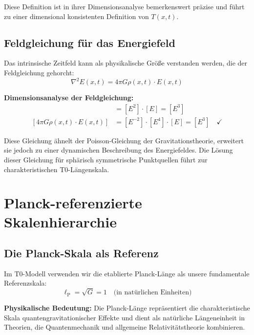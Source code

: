 \documentclass[12pt,a4paper]{report}
\newcommand{\lP}{\ell_{\text{P}}}         %
\begin{document}
	Diese Definition ist in ihrer Dimensionsanalyse bemerkenswert präzise und führt zu einer dimensional konsistenten Definition von $T(x,t)$.
	
	\subsection{Feldgleichung für das Energiefeld}\label{subsec:field_equation}
	
	Das intrinsische Zeitfeld kann als physikalische Größe verstanden werden, die der Feldgleichung gehorcht:
	\begin{equation}
		\nabla^2 E(x,t) = 4\pi G \rho(x,t) \cdot E(x,t)
		\label{eq:energy_field_equation}
	\end{equation}
	
	\textbf{Dimensionsanalyse der Feldgleichung:}
	\begin{align}
		[\nabla^2 E(x,t)] &= [E^2] \cdot [E] = [E^3] \\
		[4\pi G \rho(x,t) \cdot E(x,t)] &= [E^{-2}] \cdot [E^4] \cdot [E] = [E^3] \quad \checkmark
	\end{align}
	
	Diese Gleichung ähnelt der Poisson-Gleichung der Gravitationstheorie, erweitert sie jedoch zu einer dynamischen Beschreibung des Energiefeldes. Die Lösung dieser Gleichung für sphärisch symmetrische Punktquellen führt zur charakteristischen T0-Längenskala.
	
	\section{Planck-referenzierte Skalenhierarchie}\label{sec:planck_referenced_scales}
	
	\subsection{Die Planck-Skala als Referenz}\label{subsec:planck_reference}
	
	Im T0-Modell verwenden wir die etablierte Planck-Länge als unsere fundamentale Referenzskala:
	\begin{equation}
		\boxed{\lP = \sqrt{G} = 1 \quad \text{(in natürlichen Einheiten)}}
		\label{eq:planck_length_reference}
	\end{equation}
	
	\textbf{Physikalische Bedeutung:} Die Planck-Länge repräsentiert die charakteristische Skala quantengravitationischer Effekte und dient als natürliche Längeneinheit in Theorien, die Quantenmechanik und allgemeine Relativitätstheorie kombinieren.
	
\end{document}
